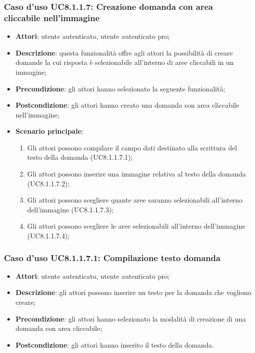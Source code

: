 \subsubsection{Caso d'uso UC8.1.1.7: Creazione domanda con area cliccabile nell'immagine}
\begin{itemize}
	\item \textbf{Attori}: utente autenticato, utente autenticato pro;
	\item \textbf{Descrizione}: questa funzionalità offre agli attori la possibilità di creare domande la cui risposta è selezionabile all'interno di aree cliccabili in un immagine;
	\item \textbf{Precondizione}: gli attori hanno selezionato la seguente funzionalità; 
	\item \textbf{Postcondizione}: gli attori hanno creato una domanda con area cliccabile nell'immagine;
	\item \textbf{Scenario principale}:
		\begin{enumerate}
	       	\item Gli attori possono compilare il campo dati destinato alla scrittura del testo della domanda (UC8.1.1.7.1);
	        \item Gli attori possono inserire una immagine relativa al testo della domanda (UC8.1.1.7.2);
			\item Gli attori possono scegliere quante aree saranno selezionabili all'interno dell'immagine (UC8.1.1.7.3);
			\item Gli attori possono scegliere le aree selezionabili all'interno dell'immagine (UC8.1.1.7.4);
	 	\end{enumerate}
\end{itemize}

\subsubsection{Caso d'uso UC8.1.1.7.1: Compilazione testo domanda}
\begin{itemize}
	\item \textbf{Attori}: utente autenticato, utente autenticato pro;
	\item \textbf{Descrizione}: gli attori possono inserire un testo per la domanda che vogliono creare;
	\item \textbf{Precondizione}: gli attori hanno selezionato la modalità di creazione di una domanda con area cliccabile;
	\item \textbf{Postcondizione}: gli attori hanno inserito il testo della domanda.
\end{itemize}


